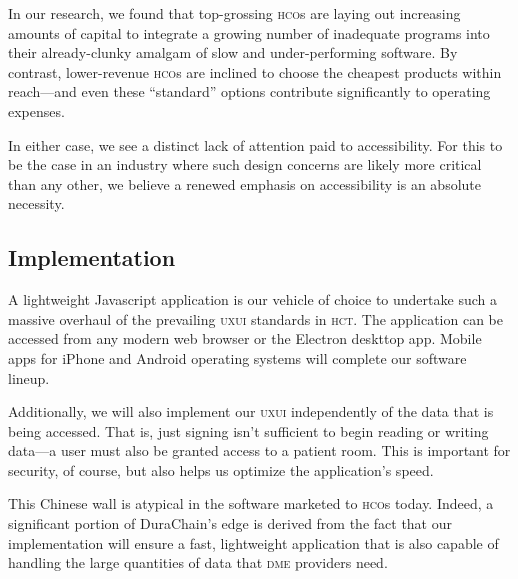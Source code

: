 In our research, we found that top-grossing \textsc{hco}s are laying out increasing amounts of capital to integrate a growing number of inadequate programs into their already-clunky amalgam of slow and under-performing software. By contrast, lower-revenue \textsc{hco}s are inclined to choose the cheapest products within reach---and even these ``standard'' options contribute significantly to operating expenses.%

In either case, we see a distinct lack of attention paid to accessibility. For this to be the case in an industry where such design concerns are likely more critical than any other, we believe a renewed emphasis on accessibility is an absolute necessity.%

\subsection{Implementation}
A lightweight Javascript application is our vehicle of choice to undertake such a massive overhaul of the prevailing \textsc{uxui} standards in \textsc{hct}. The application can be accessed from any modern web browser or the Electron deskttop app. Mobile apps for iPhone and Android operating systems will complete our software lineup.%

Additionally, we will also implement our \textsc{uxui} independently of the data that is being accessed. That is, just signing isn't sufficient to begin reading or writing data---a user must also be granted access to a patient room. This is important for security, of course, but also helps us optimize the application's speed.%

This Chinese wall is atypical in the software marketed to \textsc{hco}s today. Indeed, a significant portion of DuraChain's edge is derived from the fact that our implementation will ensure a fast, lightweight application that is also capable of handling the large quantities of data that \textsc{dme} providers need.%
